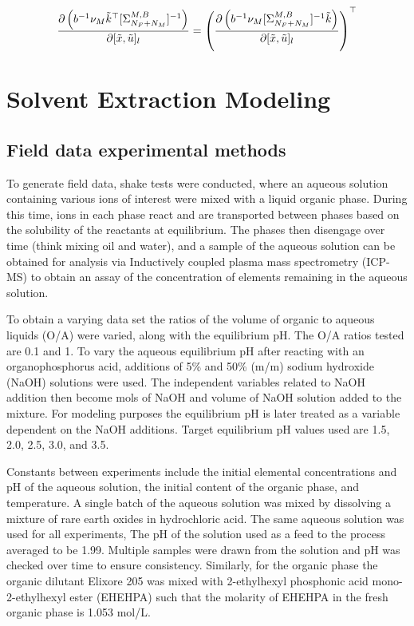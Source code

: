 \documentclass[
]{article}
\begin{document}
\begin{equation}
\frac{\partial \left(b^{-1}\nu_M\tilde{k}^{\top}[\Sigma^{M,B}_{N_F + N_M}]^{-1}\right)}{\partial [\tilde{x}, \tilde{u}]_l} = \left(\frac{\partial \left(b^{-1}\nu_M[\Sigma^{M,B}_{N_F + N_M}]^{-1}\tilde{k}\right)}{\partial[\tilde{x}, \tilde{u}]_l}\right)^{\top}
\notag
\end{equation}

\hypertarget{sxappendix}{%
\section{Solvent Extraction Modeling}\label{sxappendix}}

\hypertarget{field-data-experimental-methods}{%
\subsection{Field data experimental methods}\label{field-data-experimental-methods}}

To generate field data, shake tests were conducted, where an aqueous solution containing various ions of interest were mixed with a liquid organic phase. During this time, ions in each phase react and are transported between phases based on the solubility of the reactants at equilibrium. The phases then disengage over time (think mixing oil and water), and a sample of the aqueous solution can be obtained for analysis via Inductively coupled plasma mass spectrometry (ICP-MS) to obtain an assay of the concentration of elements remaining in the aqueous solution.

To obtain a varying data set the ratios of the volume of organic to aqueous liquids (O/A) were varied, along with the equilibrium pH. The O/A ratios tested are 0.1 and 1. To vary the aqueous equilibrium pH after reacting with an organophosphorus acid, additions of 5\% and 50\% (m/m) sodium hydroxide (NaOH) solutions were used. The independent variables related to NaOH addition then become mols of NaOH and volume of NaOH solution added to the mixture. For modeling purposes the equilibrium pH is later treated as a variable dependent on the NaOH additions. Target equilibrium pH values used are 1.5, 2.0, 2.5, 3.0, and 3.5.

Constants between experiments include the initial elemental concentrations and pH of the aqueous solution, the initial content of the organic phase, and temperature. A single batch of the aqueous solution was mixed by dissolving a mixture of rare earth oxides in hydrochloric acid. The same aqueous solution was used for all experiments, The pH of the solution used as a feed to the process averaged to be 1.99. Multiple samples were drawn from the solution and pH was checked over time to ensure consistency. Similarly, for the organic phase the organic dilutant Elixore 205 was mixed with 2-ethylhexyl phosphonic acid mono-2-ethylhexyl ester (EHEHPA) such that the molarity of EHEHPA in the fresh organic phase is 1.053 mol/L.
\end{document}
